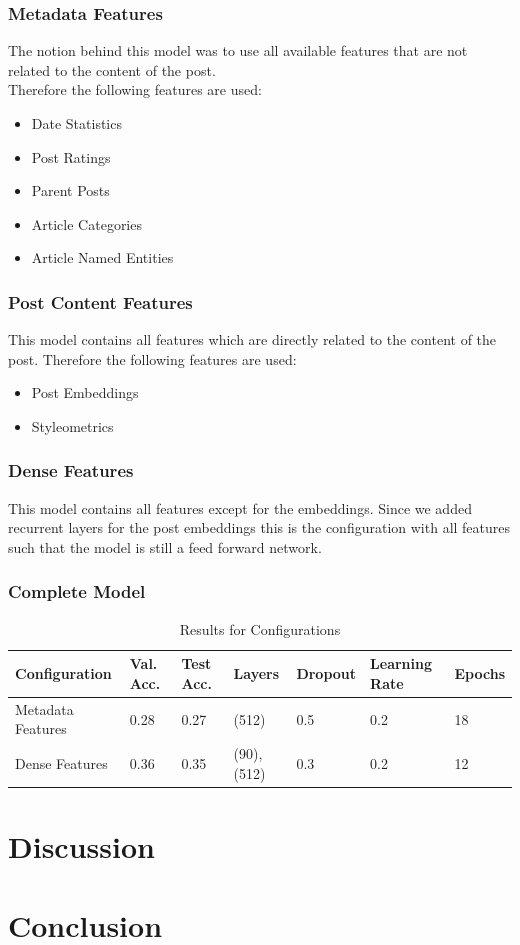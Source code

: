 \documentclass[acmsmall]{acmart}
\begin{document}
\subsubsection{Metadata Features}
The notion behind this model was to use all available features that are not related to the content of the post. \\
Therefore the following features are used:
\begin{itemize}
\item Date Statistics
\item Post Ratings
\item Parent Posts
\item Article Categories
\item Article Named Entities
\end{itemize}

\subsubsection{Post Content Features}
This model contains all features which are directly related to the content of the post. 
Therefore the following features are used:
\begin{itemize}
\item Post Embeddings
\item Styleometrics
\end{itemize}

\subsubsection{Dense Features}
This model contains all features except for the embeddings. Since we added recurrent layers for the post embeddings this is the configuration with all features such that the model is still a feed forward network. 

\subsubsection{Complete Model}


\begin{table}[H]
\begin{tabular}{lllllll}
Configuration & Val. Acc. & Test Acc. & Layers & Dropout & Learning Rate & Epochs\\ \hline
Metadata Features & 0.28 & 0.27 & (512) &  0.5 & 0.2 & 18 \\
Dense Features & 0.36 & 0.35 & (90),(512) & 0.3 & 0.2 & 12 \\
\end{tabular}
\caption{Results for Configurations}
\label{tab:result_configurations}
\end{table}


\section{Discussion}

\section{Conclusion}




\end{document}
